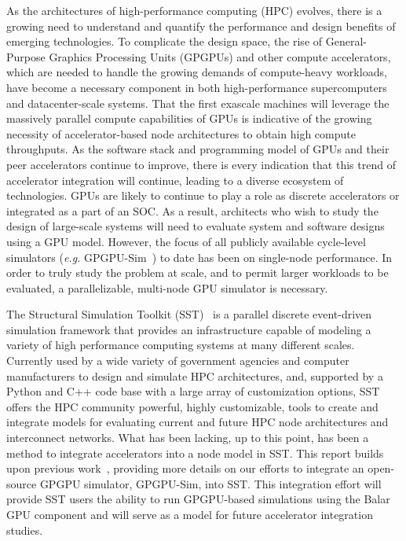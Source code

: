As the architectures of high-performance computing (HPC) evolves, there is a growing
need to understand and quantify the performance and design benefits of
emerging technologies. To complicate the design space, the rise of
General-Purpose Graphics Processing Units (GPGPUs) and other compute
accelerators, which are needed to handle the growing demands of compute-heavy
workloads, have become a necessary component in both high-performance
supercomputers and datacenter-scale systems. That the first exascale machines
will leverage the massively parallel compute capabilities of GPUs
\cite{snl_roadmap, ornl_roadmap, llnl_roadmap} is indicative of the growing
necessity of accelerator-based node architectures to obtain high compute
throughputs. As the software stack and
programming model of GPUs and their peer accelerators continue to improve, there
is every indication that this trend of accelerator integration will continue,
leading to a diverse ecosystem of technologies. GPUs are likely to continue to
play a role as discrete accelerators or integrated as a part of an SOC. As a
result, architects who wish to study the design of large-scale systems will need
to evaluate system and software designs using a GPU model. However, the focus of
all publicly available cycle-level simulators ({\em e.g.} GPGPU-Sim~\cite{gpgpu_sim})
to date has been on single-node performance. In order to truly study the problem at scale,
and to permit larger workloads to be evaluated, a parallelizable, multi-node GPU
simulator is necessary.

The Structural Simulation Toolkit (SST)~\cite{sst} is a parallel discrete
event-driven simulation framework that provides an infrastructure capable of
modeling a variety of high performance computing systems at many different
scales. Currently used by a wide variety of government agencies and computer
manufacturers to design and simulate HPC architectures, and, supported by a
Python and C++ code base with a large array of customization options, SST offers
the HPC community powerful, highly customizable, tools to create and integrate
models for evaluating current and future HPC node architectures and interconnect
networks. What has been lacking, up to this point, has been a method
to integrate accelerators into a node model in SST. This report builds upon
previous work~\cite{sst_gpgpu}, providing more details on our efforts to
integrate an open-source GPGPU simulator, GPGPU-Sim, into SST. This integration effort
will provide SST users the ability to run GPGPU-based simulations using the Balar
GPU component and will serve as a model for future accelerator integration
studies.

